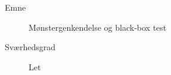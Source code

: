 \begin{description}
\item[Emne] Mønstergenkendelse og black-box test
\item[Sværhedsgrad] Let
\end{description}
